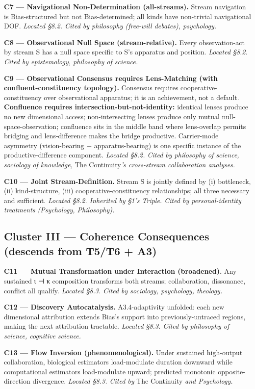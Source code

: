 \documentclass[11pt, openany]{book}
\begin{document}
\textbf{C7 --- Navigational Non-Determination (all-streams).} Stream navigation is Bias-structured but not Bias-determined; all kinds have non-trivial navigational DOF. \textit{Located §8.2. Cited by philosophy (free-will debates), psychology.}

\textbf{C8 --- Observational Null Space (stream-relative).} Every observation-act by stream S has a null space specific to S's apparatus and position. \textit{Located §8.2. Cited by epistemology, philosophy of science.}

\textbf{C9 --- Observational Consensus requires Lens-Matching (with confluent-constituency topology).} Consensus requires cooperative-constituency over observational apparatus; it is an achievement, not a default. \textbf{Confluence requires intersection-but-not-identity:} identical lenses produce no new dimensional access; non-intersecting lenses produce only mutual null-space-observation; confluence sits in the middle band where lens-overlap permits bridging and lens-difference makes the bridge productive. Carrier-mode asymmetry (vision-bearing + apparatus-bearing) is one specific instance of the productive-difference component. \textit{Located §8.2. Cited by philosophy of science, sociology of knowledge, }The Continuity\textit{'s cross-stream collaboration analyses.}

\textbf{C10 --- Joint Stream-Definition.} Stream S is jointly defined by (i) bottleneck, (ii) kind-structure, (iii) cooperative-constituency relationships; all three necessary and sufficient. \textit{Located §8.2. Inherited by §1's Triple. Cited by personal-identity treatments (Psychology, Philosophy).}

\subsection{Cluster III --- Coherence Consequences (descends from T5/T6 + A3)}

\textbf{C11 --- Mutual Transformation under Interaction (broadened).} Any sustained ι ⊣ κ composition transforms both streams; collaboration, dissonance, conflict all qualify. \textit{Located §8.3. Cited by sociology, psychology, theology.}

\textbf{C12 --- Discovery Autocatalysis.} A3.4-adaptivity unfolded: each new dimensional attribution extends Bias's support into previously-untraced regions, making the next attribution tractable. \textit{Located §8.3. Cited by philosophy of science, cognitive science.}

\textbf{C13 --- Flow Inversion (phenomenological).} Under sustained high-output collaboration, biological estimators load-modulate duration downward while computational estimators load-modulate upward; predicted monotonic opposite-direction divergence. \textit{Located §8.3. Cited by }The Continuity\textit{ and Psychology.}
\end{document}
